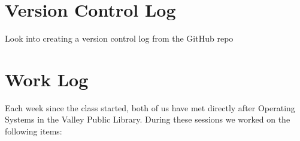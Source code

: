 \documentclass[a4paper]{article}
\begin{document}
\section{Version Control Log}
Look into creating a version control log from the GitHub repo


\section{Work Log}
Each week since the class started, both of us have met directly after Operating Systems in the Valley Public Library. During these sessions we worked on the following items:




\end{document}
